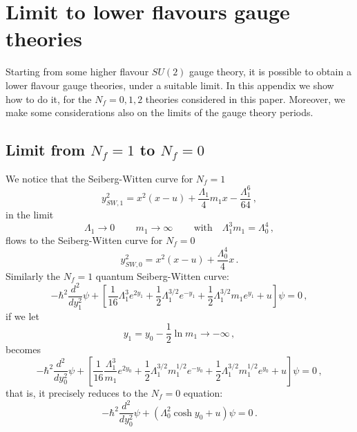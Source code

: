 \documentclass[11pt,a4paper]{elsarticle}
\newcommand{\be}{\begin{equation}}
\newcommand{\ee}{\end{equation}}
\numberwithin{figure}{section}
\numberwithin{table}{section}
\begin{document}
\section{Limit to lower flavours gauge theories} \label{appLimit}

Starting from some higher flavour $SU(2)$ gauge theory, it is possible to obtain a lower flavour gauge theories, under a suitable limit. In this appendix we show how to do it, for the $N_f=0,1,2$ theories considered in this paper. Moreover, we make some considerations also on the limits of the gauge theory periods.

\subsection{Limit from $N_f=1$ to $N_f=0$}

We notice that the Seiberg-Witten curve for $N_f=1$
\be 
y^2_{SW,1} =x^2(x-u) + \frac{\Lambda_1}{4}m_1 x -\frac{\Lambda_1^6}{64}\,,
\ee 
in the limit
\be 
\Lambda_1 \to 0 \, \qquad m_1 \to \infty \, \qquad \text{with}\quad  \Lambda_1^3 m_1 = \Lambda_0^4\,,
\ee 
flows to the Seiberg-Witten curve for $N_f=0$
\be 
y^2_{SW,0}= x^2(x-u) + \frac{\Lambda_0^4}{4}x\,.
\ee 
Similarly the $N_f=1$ quantum Seiberg-Witten curve:
\be 
-\hbar^2  \frac{d^2}{d y_1^2} \psi + \left[\frac{1}{16} \Lambda_1^3 e^{2y_1} +\frac{1}{2}\Lambda_1^{3/2}e^{-y_1}  +\frac{1}{2} \Lambda_1^{3/2} m_1 e^{y_1} +u\right] \psi = 0 \,,
\ee
if we let 
\be 
y_1 = y_0-\frac{1}{2}\ln m_1 \to - \infty\,,
\ee
becomes
\be 
-\hbar^2  \frac{d^2}{d y_0^{2}} \psi + \left[\frac{1}{16} \frac{\Lambda_1^3}{m_1} e^{2y_0} +\frac{1}{2}\Lambda_1^{3/2}m_1^{1/2}e^{-y_0}  +\frac{1}{2} \Lambda_1^{3/2} m_1^{1/2} e^{y_0} +u\right] \psi = 0\,,
\ee
that is, it precisely reduces to the $N_f=0$ equation:
\be 
-\hbar^2  \frac{d^2}{d y_0^2} \psi + ( \Lambda_0^2 \cosh y_0 + u) \psi = 0 \,.
\ee
\end{document}
